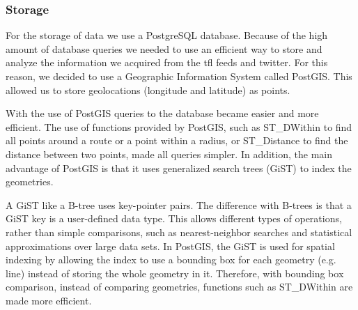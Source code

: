 \subsubsection{Storage}
For the storage of data we use a PostgreSQL database. Because of the high amount of database queries we needed to use an efficient way to store and analyze the information we acquired from the tfl feeds and twitter. For this reason, we decided to use a Geographic Information System called PostGIS. This allowed us to store geolocations (longitude and latitude) as points.

With the use of PostGIS queries to the database became easier and more efficient. The use of functions provided by PostGIS, such as ST\_DWithin to find all points around a route or a point within a radius, or ST\_Distance to find the distance between two points, made all queries simpler. In addition, the main advantage of PostGIS is that it uses generalized search trees (GiST) to index the geometries. 

A GiST like a B-tree uses key-pointer pairs. The difference with B-trees is that a GiST key is a user-defined data type. This allows different types of operations, rather than simple comparisons, such as nearest-neighbor searches and statistical approximations over large data sets. In PostGIS, the GiST is used for spatial indexing by allowing the index to use a bounding box for each geometry (e.g. line) instead of storing the whole geometry in it. Therefore, with bounding box comparison, instead of comparing geometries, functions such as ST\_DWithin are made more efficient.

